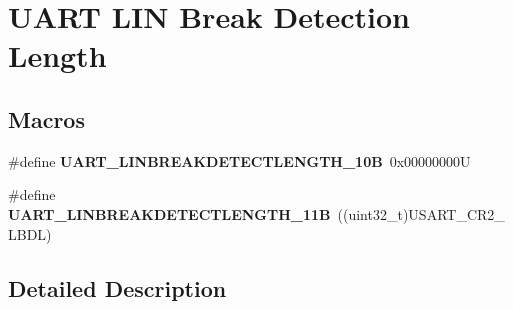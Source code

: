 \hypertarget{group___u_a_r_t___l_i_n___break___detection___length}{}\section{U\+A\+RT L\+IN Break Detection Length}
\label{group___u_a_r_t___l_i_n___break___detection___length}
\subsection*{Macros}
\begin{DoxyCompactItemize}
\item 
\mbox{\label{group___u_a_r_t___l_i_n___break___detection___length_ga027616b7a36b36e0e51ffee947533624}} 
\#define {\bfseries U\+A\+R\+T\+\_\+\+L\+I\+N\+B\+R\+E\+A\+K\+D\+E\+T\+E\+C\+T\+L\+E\+N\+G\+T\+H\+\_\+10B}~0x00000000U
\item 
\mbox{\label{group___u_a_r_t___l_i_n___break___detection___length_ga2f66fcd37de7a3ca9e1101305f2e23e6}} 
\#define {\bfseries U\+A\+R\+T\+\_\+\+L\+I\+N\+B\+R\+E\+A\+K\+D\+E\+T\+E\+C\+T\+L\+E\+N\+G\+T\+H\+\_\+11B}~((uint32\+\_\+t)U\+S\+A\+R\+T\+\_\+\+C\+R2\+\_\+\+L\+B\+DL)
\end{DoxyCompactItemize}


\subsection{Detailed Description}
